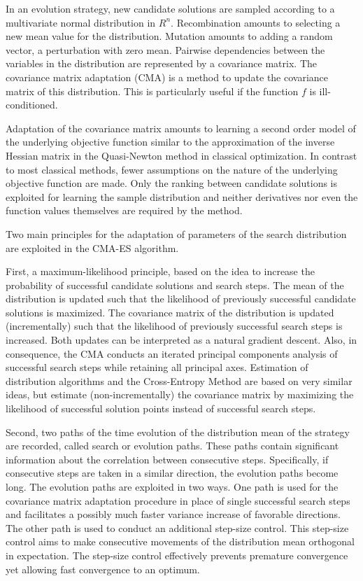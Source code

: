 In an evolution strategy, new candidate solutions are sampled according to a multivariate normal distribution in ${R}^{n}$. Recombination amounts to selecting a new mean value for the distribution. Mutation amounts to adding a random vector, a perturbation with zero mean. Pairwise dependencies between the variables in the distribution are represented by a covariance matrix. The covariance matrix adaptation (CMA) is a method to update the covariance matrix of this distribution. This is particularly useful if the function $f$ is ill-conditioned.

Adaptation of the covariance matrix amounts to learning a second order model of the underlying objective function similar to the approximation of the inverse Hessian matrix in the Quasi-Newton method in classical optimization. In contrast to most classical methods, fewer assumptions on the nature of the underlying objective function are made. Only the ranking between candidate solutions is exploited for learning the sample distribution and neither derivatives nor even the function values themselves are required by the method.

Two main principles for the adaptation of parameters of the search distribution are exploited in the CMA-ES algorithm.

First, a maximum-likelihood principle, based on the idea to increase the probability of successful candidate solutions and search steps. The mean of the distribution is updated such that the likelihood of previously successful candidate solutions is maximized. The covariance matrix of the distribution is updated (incrementally) such that the likelihood of previously successful search steps is increased. Both updates can be interpreted as a natural gradient descent. Also, in consequence, the CMA conducts an iterated principal components analysis of successful search steps while retaining all principal axes. Estimation of distribution algorithms and the Cross-Entropy Method are based on very similar ideas, but estimate (non-incrementally) the covariance matrix by maximizing the likelihood of successful solution points instead of successful search steps.

Second, two paths of the time evolution of the distribution mean of the strategy are recorded, called search or evolution paths. These paths contain significant information about the correlation between consecutive steps. Specifically, if consecutive steps are taken in a similar direction, the evolution paths become long. The evolution paths are exploited in two ways. One path is used for the covariance matrix adaptation procedure in place of single successful search steps and facilitates a possibly much faster variance increase of favorable directions. The other path is used to conduct an additional step-size control. This step-size control aims to make consecutive movements of the distribution mean orthogonal in expectation. The step-size control effectively prevents premature convergence yet allowing fast convergence to an optimum.

